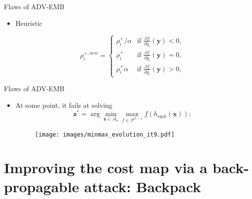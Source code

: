\documentclass[10pt]{beamer}
\newcommand{\femb}{h_{\mathrm{emb}}}
\newcommand{\fset}{\mathcal{F}}
\begin{document}
\begin{frame}{Flaws of ADV-EMB}

    \begin{itemize}

        \item Heuristic
        
            \begin{equation}
                \rho_{i}^{+, new} = 
                \left\{
                    \begin{array}{ll}
                        \rho_{i}^+/\alpha & \mbox{if } \frac{\partial f}{\partial y_{i}}\left(\mathbf{y}\right) < 0, \\
                        \rho_{i}^+ & \mbox{if } \frac{\partial f}{\partial y_{i}}\left(\mathbf{y}\right) = 0, \\
                        \rho_{i}^+ \alpha & \mbox{if } \frac{\partial f}{\partial y_{i}}\left(\mathbf{y}\right) > 0,
                    \end{array}
                \right.
            \end{equation}

    \end{itemize}

\end{frame}



\begin{frame}{Flaws of ADV-EMB}

    \begin{itemize}
            
        \item At some point, it fails at solving
            \begin{equation*}
                \mathbf{z}^\ast = \arg \min_{\mathbf{z} \in \mathcal{A}_a} \max_{f \in \fset^{k-1}} f(\femb(\mathbf{x}));
            \end{equation*} 
            
            \begin{figure}
                \texttt{[image: images/minmax\_evolution\_it9.pdf]}
             \end{figure}
              
    \end{itemize}

\end{frame}
    



\section{Improving the cost map via a back-propagable attack: Backpack}
\end{document}
